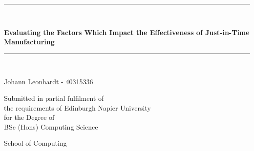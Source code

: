 \newcommand{\HRule}{\rule{\linewidth}{0.5mm}}

\begin{titlepage}
\begin{center}
\HRule \\[0.4cm]
    {\large \bfseries Evaluating the Factors Which Impact the Effectiveness of Just-in-Time Manufacturing\par}
\vspace{0.2cm}
\HRule \\[1.5cm]

\vspace{3cm}
\begin{minipage}{0.5\textwidth}
    \begin{center} \large
        Johann Leonhardt - 40315336      
    \end{center}
\end{minipage}

\vspace{2cm}
\begin{minipage}{1\textwidth}
    \begin{center} \large
    Submitted in partial fulfilment of \\
    the requirements of Edinburgh Napier University \\
    for the Degree of \\
    BSc (Hons) Computing Science
    \end{center}
\end{minipage}

\vfill

\begin{minipage}{1\textwidth}
    \begin{center} \large
    School of Computing
    \end{center}
\end{minipage}

\vspace{1cm}{\large \today}
\end{center}
\end{titlepage}
